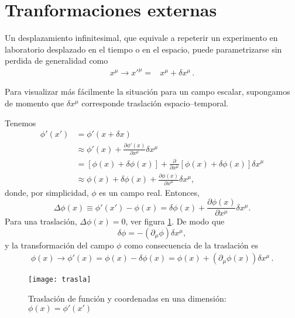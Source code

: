 \section{Tranformaciones externas}
\label{sec:tranf-extern}
\begin{frame}
Un desplazamiento infinitesimal, que equivale a repeterir un experimento en laboratorio desplazado en el tiempo o en el espacio,
puede parametrizarse sin perdida de generalidad como
\begin{align}
  x^\mu\to{x'}^\mu=&x^\mu+\delta x^{\mu}\,.
\end{align}

Para visualizar más fácilmente la situación para un campo escalar, supongamos de momento que $\delta x^{\mu}$ corresponde  traslaci\'on espacio--temporal.

Tenemos
\begin{align}
  \phi'(x')&=\phi'(x+\delta x)\\
  &\approx\phi'(x)+\frac{\partial\phi'(x)}{\partial x^\mu}\delta x^\mu\\
  &=[\phi(x)+\delta\phi(x)]+\frac{\partial}{\partial x^\mu}[\phi(x)+\delta\phi(x)]\delta x^\mu\\
  &\approx\phi(x)+\delta\phi(x)+\frac{\partial\phi(x)}{\partial x^\mu}\delta x^\mu,
\end{align}
donde, por simplicidad, $\phi$ es un campo real. Entonces,
\begin{equation}
  \label{eq:Deltaf}
  \Delta\phi(x)\equiv\phi'(x')-\phi(x)=\delta\phi(x)+\frac{\partial\phi(x)}{\partial x^\mu}\delta x^\mu.
\end{equation}
Para una traslaci\'on, $\Delta\phi(x)=0$, ver figura 
\ref{fig:trasla}. %
De modo que
\begin{equation}
  \label{eq:dmuxmu}
  \delta\phi=-(\partial_\mu\phi)\delta x^\mu,
\end{equation}
y la transformaci\'on del campo $\phi$ como consecuencia de la traslaci\'on es
\begin{align}
  \phi(x)\to\phi'(x)=\phi(x)-\delta\phi(x)=\phi(x)+(\partial_\mu\phi(x))\delta x^\mu\,.
\end{align}

\begin{figure} %
  \centering %
  \texttt{[image: trasla]} %
  \caption{Traslaci\'on de funci\'on y coordenadas en una dimensi\'on: $\phi(x)=\phi'(x')$ } %
  \label{fig:trasla} %
\end{figure} %

\end{frame}




